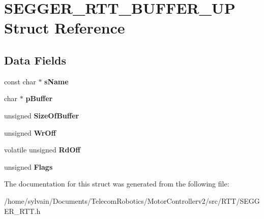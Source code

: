 \hypertarget{structSEGGER__RTT__BUFFER__UP}{}\section{S\+E\+G\+G\+E\+R\+\_\+\+R\+T\+T\+\_\+\+B\+U\+F\+F\+E\+R\+\_\+\+UP Struct Reference}
\label{structSEGGER__RTT__BUFFER__UP}
\subsection*{Data Fields}
\begin{DoxyCompactItemize}
\item 
\hypertarget{structSEGGER__RTT__BUFFER__UP_a6ca6c6087f49fc73cf9c60fa249db581}{}\label{structSEGGER__RTT__BUFFER__UP_a6ca6c6087f49fc73cf9c60fa249db581} 
const char $\ast$ {\bfseries s\+Name}
\item 
\hypertarget{structSEGGER__RTT__BUFFER__UP_a55af663660f355dd66148ea3a12086cb}{}\label{structSEGGER__RTT__BUFFER__UP_a55af663660f355dd66148ea3a12086cb} 
char $\ast$ {\bfseries p\+Buffer}
\item 
\hypertarget{structSEGGER__RTT__BUFFER__UP_a723612a58edf1812316c6d68b1a5e10a}{}\label{structSEGGER__RTT__BUFFER__UP_a723612a58edf1812316c6d68b1a5e10a} 
unsigned {\bfseries Size\+Of\+Buffer}
\item 
\hypertarget{structSEGGER__RTT__BUFFER__UP_add452c6f708e96f6bd6bf200736c2d0a}{}\label{structSEGGER__RTT__BUFFER__UP_add452c6f708e96f6bd6bf200736c2d0a} 
unsigned {\bfseries Wr\+Off}
\item 
\hypertarget{structSEGGER__RTT__BUFFER__UP_a5656936cd59a5ddab55af1aa1467b67f}{}\label{structSEGGER__RTT__BUFFER__UP_a5656936cd59a5ddab55af1aa1467b67f} 
volatile unsigned {\bfseries Rd\+Off}
\item 
\hypertarget{structSEGGER__RTT__BUFFER__UP_a1909346568b558be56c77e2c6e79882b}{}\label{structSEGGER__RTT__BUFFER__UP_a1909346568b558be56c77e2c6e79882b} 
unsigned {\bfseries Flags}
\end{DoxyCompactItemize}


The documentation for this struct was generated from the following file\+:\begin{DoxyCompactItemize}
\item 
/home/sylvain/\+Documents/\+Telecom\+Robotics/\+Motor\+Controllerv2/src/\+R\+T\+T/S\+E\+G\+G\+E\+R\+\_\+\+R\+T\+T.\+h\end{DoxyCompactItemize}
